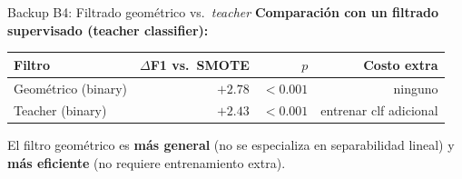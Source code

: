 \begin{frame}{Backup B4: Filtrado geométrico vs.\ \textit{teacher}}
\small
\textbf{Comparación con un filtrado supervisado (teacher classifier):}

\vspace{0.5em}
\begin{tabular}{@{}lrrr@{}}
\toprule
Filtro & $\Delta$F1 vs.\ SMOTE & $p$ & Costo extra \\
\midrule
Geométrico (binary) & \alert{$+2{.}78$} & $<0{.}001$ & ninguno \\
Teacher (binary)    & $+2{.}43$         & $<0{.}001$ & entrenar clf adicional \\
\bottomrule
\end{tabular}

\vspace{0.6em}
\begin{insight}
\scriptsize El filtro geométrico es \textbf{más general} (no se especializa en separabilidad lineal) y \textbf{más eficiente} (no requiere entrenamiento extra).
\end{insight}
\end{frame}

